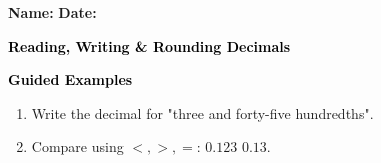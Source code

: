 \documentclass[12pt, letterpaper, fleqn]{article}
\newcommand{\blank}{\underline{\hspace{2.2cm}}}
\begin{document}
\textbf{Name:} \underline{\hspace{5cm}}
\hfill
\textbf{Date:} \underline{\hspace{3cm}}\\

\begin{tcolorbox}[colback=customteal!20]
    \large\textcolor{black}{\textbf{Reading, Writing & Rounding Decimals}}
\end{tcolorbox}
\newpage
\begin{tcolorbox}[colback=customteal!20]
    \large\textcolor{black}{\textbf{Guided Examples}}
\end{tcolorbox}
\begin{enumerate}[itemsep=3.5cm, leftmargin=0.6cm]
\item Write the decimal for "three and forty-five hundredths".
\vspace{3cm}
\item Compare using $<, >, =$: $0.123$ \blank $0.13$.
\end{enumerate}
\end{document}

